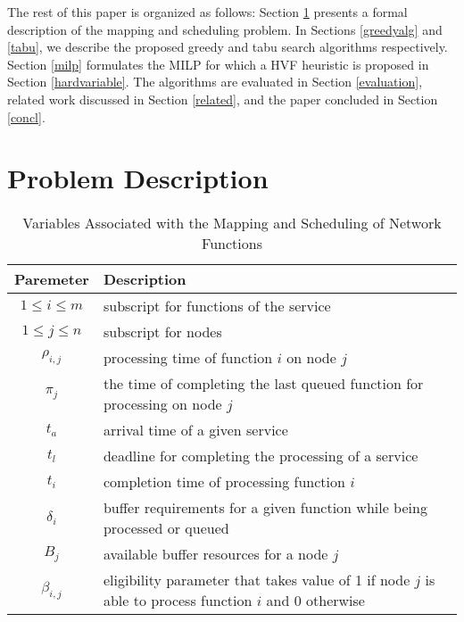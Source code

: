 \documentclass[conference]{IEEEtran}
\begin{document}
\indent The rest of this paper is organized as follows: Section \ref{problem} presents a formal description of the mapping and scheduling problem. In Sections \ref{greedyalg} and \ref{tabu}, we describe the proposed greedy and tabu search algorithms respectively. Section \ref{milp} formulates the \ac{MILP} for which a HVF heuristic is proposed in Section \ref{hardvariable}. The algorithms are evaluated in Section \ref{evaluation}, related work discussed in Section \ref{related}, and the paper concluded in Section \ref{concl}.
\section{Problem Description}\label{problem}
\begin{table*}[t]
\begin{minipage}{1\textwidth}
\caption{Variables Associated with the Mapping and Scheduling of Network Functions}
\renewcommand{\arraystretch}{1.3}
\small
\centering
{}
\begin{tabular}{ c l}\hline
\bfseries Paremeter & \bfseries Description\\
\hline\hline
$1\leq i \leq m$ & subscript for functions of the service\\
$1\leq j \leq n$ & subscript for nodes\\
$\rho_{i,j}$ & processing time of function $i$ on node $j$\\
$\pi_{j}$ & the time of completing the last queued function for processing on node $j$\\
$t_{a}$ & arrival time of a given service\\
$t_{l}$ & deadline for completing the processing of a service\\
$t_{i}$ & completion time of processing function $i$\\
$\delta_{i}$ & buffer requirements for a given function while being processed or queued\\
$B_{j}$ & available buffer resources for a node $j$\\
$\beta_{i,j}$ & eligibility parameter that takes value of 1 if node $j$ is able to process function $i$ and 0 otherwise\\
\hline
\end{tabular}
\label{variables}
\end{minipage}
\end{table*}
\end{document}

